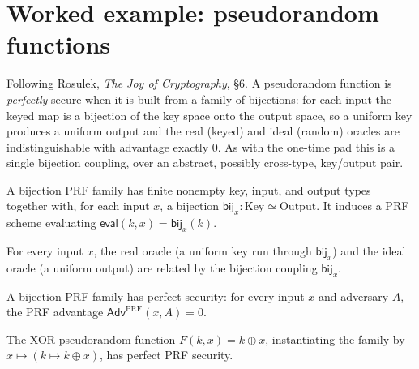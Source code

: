 \chapter{Worked example: pseudorandom functions}

Following Rosulek, \emph{The Joy of Cryptography}, §6. A pseudorandom function is
\emph{perfectly} secure when it is built from a family of bijections: for each
input the keyed map is a bijection of the key space onto the output space, so a
uniform key produces a uniform output and the real (keyed) and ideal (random)
oracles are indistinguishable with advantage exactly $0$. As with the one-time pad
this is a single bijection coupling, over an abstract, possibly cross-type,
key/output pair.

\begin{definition}
  \label{def:bijprf}
  \leanok
  A bijection PRF family has finite nonempty key, input, and output types together
  with, for each input $x$, a bijection $\mathsf{bij}_x : \mathrm{Key} \simeq
  \mathrm{Output}$. It induces a PRF scheme evaluating $\mathsf{eval}(k, x) =
  \mathsf{bij}_x(k)$.
\end{definition}

\begin{lemma}
  \label{lem:bijprf-coupling}
  \leanok
  For every input $x$, the real oracle (a uniform key run through
  $\mathsf{bij}_x$) and the ideal oracle (a uniform output) are related by the
  bijection coupling $\mathsf{bij}_x$.
\end{lemma}

\begin{theorem}
  \label{thm:bijprf-perfect}
  \leanok
  A bijection PRF family has perfect security: for every input $x$ and adversary
  $A$, the PRF advantage $\mathsf{Adv}^{\mathrm{PRF}}(x, A) = 0$.
\end{theorem}

\begin{corollary}
  \label{cor:xorprf}
  \leanok
  The XOR pseudorandom function $F(k, x) = k \oplus x$, instantiating the family by
  $x \mapsto (k \mapsto k \oplus x)$, has perfect PRF security.
\end{corollary}

